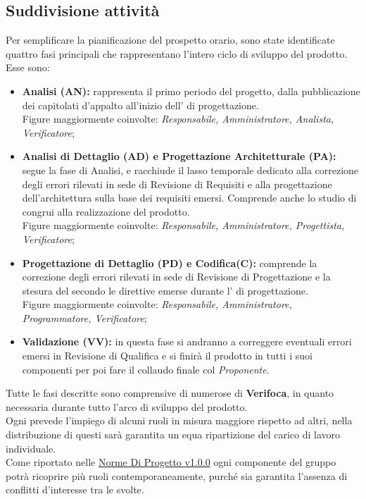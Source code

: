 \documentclass{scalatekids-article}
\begin{document}
\subsection{Suddivisione attività}
\label{sub:fasi}
Per semplificare la pianificazione del prospetto orario, sono state identificate
quattro fasi principali che rappresentano l'intero ciclo di sviluppo del prodotto.\\
Esse sono:
\begin{itemize}
\item\textbf{Analisi (AN):} rappresenta il primo periodo del progetto,
dalla
  pubblicazione dei capitolati d'appalto all'inizio dell' di progettazione.\\
  Figure maggiormente coinvolte: \textit{Responsabile, Amministratore, Analista, Verificatore};
\item\textbf{Analisi di Dettaglio (AD) e Progettazione Architetturale (PA):} segue la fase di Analisi, e
  racchiude il lasso temporale dedicato alla correzione degli errori rilevati in
  sede di Revisione di Requisiti e alla progettazione dell'architettura sulla
  base dei requisiti emersi. Comprende anche lo studio di 
  congrui alla realizzazione del prodotto.\\ Figure maggiormente coinvolte:
  \textit{Responsabile, Amministratore, Progettista, Verificatore};
\item\textbf{Progettazione di Dettaglio (PD) e Codifica(C):} comprende la correzione degli errori rilevati in sede di Revisione di Progettazione e la stesura del  secondo le direttive emerse durante l' di progettazione.\\Figure maggiormente coinvolte:
  \textit{Responsabile, Amministratore, Programmatore, Verificatore};
\item\textbf{Validazione (VV):} in questa fase si andranno a correggere eventuali errori emersi in Revisione di Qualifica e si finirà il prodotto in tutti i suoi componenti per poi fare il collaudo finale col \textit{Proponente}.
\end{itemize}
Tutte le fasi descritte sono comprensive di numerose  di \textbf{Verifoca}, in quanto necessaria durante tutto l'arco di sviluppo del prodotto.\\Ogni {} prevede l'impiego di alcuni ruoli in misura maggiore rispetto ad altri, nella distribuzione di questi sarà garantita un equa ripartizione del
carico di lavoro individuale.\\
Come riportato nelle \href{run:../Interni/NormeDiProgetto\_v1.0.0.pdf}{Norme Di Progetto v1.0.0} ogni componente del gruppo potrà ricoprire più ruoli contemporaneamente, purché sia garantita l'assenza di conflitti d'interesse tra le  svolte.\\ \\
\end{document}
